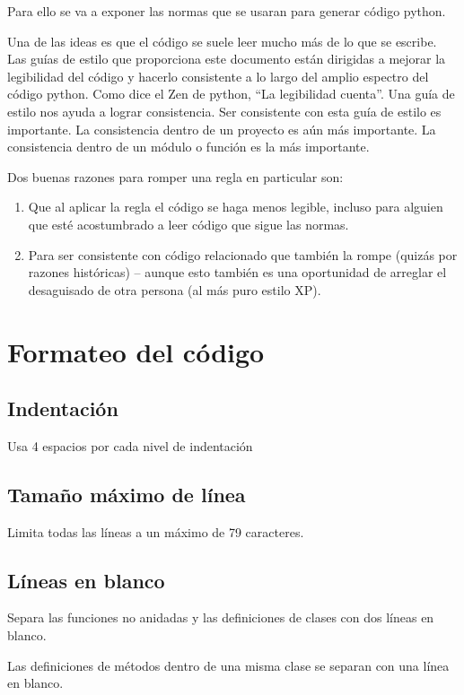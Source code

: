 \documentclass[a4paper,11pt,oneside]{book}
\begin{document}
Para ello se va a exponer las normas que se usaran para generar código python.

Una de las ideas es que el código se suele leer mucho más de lo que se escribe. Las guías de estilo que proporciona este documento están dirigidas a mejorar la legibilidad del código y hacerlo consistente a lo largo del amplio espectro del código python. Como dice el Zen de python, ``La legibilidad cuenta''.
Una guía de estilo nos ayuda a lograr consistencia. Ser consistente con esta guía de estilo es importante.
La consistencia dentro de un proyecto es aún más importante. La consistencia dentro de un módulo o función es la más importante.

Dos buenas razones para romper una regla en particular son:

\begin{enumerate}
\item Que al aplicar la regla el código se haga menos legible, incluso para alguien que esté acostumbrado a leer código que sigue las normas.
\item Para ser consistente con código relacionado que también la rompe (quizás por razones históricas) -- aunque esto también es una oportunidad de arreglar el desaguisado de otra persona (al más puro estilo XP).
\end{enumerate}

\section{Formateo del código}
\subsection{Indentación}
Usa 4 espacios por cada nivel de indentación

\subsection{Tamaño máximo de línea}
Limita todas las líneas a un máximo de 79 caracteres.

\subsection{Líneas en blanco}
Separa las funciones no anidadas y las definiciones de clases con dos líneas en blanco.

Las definiciones de métodos dentro de una misma clase se separan con una línea en blanco.
\end{document}
